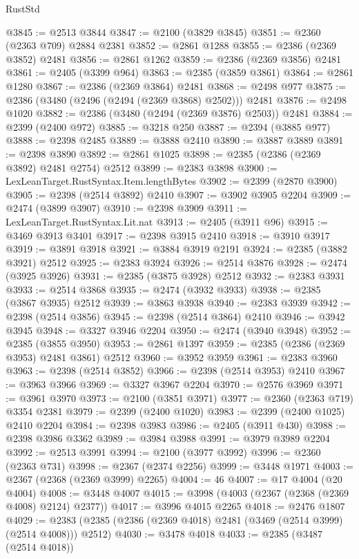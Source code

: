 \begin{lexlean}{RustStd}
\begin{coremodule}
@3845 := @2513 @3844
@3847 := @2100 (@3829 @3845)
@3851 := @2360 (@2363 @709) @2884 @2381
@3852 := @2861 @1288
@3855 := @2386 (@2369 @3852) @2481
@3856 := @2861 @1262
@3859 := @2386 (@2369 @3856) @2481
@3861 := @2405 (@3399 @964)
@3863 := @2385 (@3859 @3861)
@3864 := @2861 @1280
@3867 := @2386 (@2369 @3864) @2481
@3868 := @2498 @977
@3875 := @2386 (@3480 (@2496 (@2494 (@2369 @3868) @2502))) @2481
@3876 := @2498 @1020
@3882 := @2386 (@3480 (@2494 (@2369 @3876) @2503)) @2481
@3884 := @2399 (@2400 @972)
@3885 := @3218 @250
@3887 := @2394 (@3885 @977)
@3888 := @2398 @2485
@3889 := @3888 @2410
@3890 := @3887 @3889
@3891 := @2398 @3890
@3892 := @2861 @1025
@3898 := @2385 (@2386 (@2369 @3892) @2481 @2754) @2512
@3899 := @2383 @3898
@3900 := LexLeanTarget.RustSyntax.Item.lengthBytes
@3902 := @2399 (@2870 @3900)
@3905 := @2398 (@2514 @3892) @2410
@3907 := @3902 @3905 @2204
@3909 := @2474 (@3899 @3907)
@3910 := @2398 @3909
@3911 := LexLeanTarget.RustSyntax.Lit.nat
@3913 := @2405 (@3911 @96)
@3915 := @3469 @3913 @3401
@3917 := @2398 @3915 @2410
@3918 := @3910 @3917
@3919 := @3891 @3918
@3921 := @3884 @3919 @2191
@3924 := @2385 (@3882 @3921) @2512
@3925 := @2383 @3924
@3926 := @2514 @3876
@3928 := @2474 (@3925 @3926)
@3931 := @2385 (@3875 @3928) @2512
@3932 := @2383 @3931
@3933 := @2514 @3868
@3935 := @2474 (@3932 @3933)
@3938 := @2385 (@3867 @3935) @2512
@3939 := @3863 @3938
@3940 := @2383 @3939
@3942 := @2398 (@2514 @3856)
@3945 := @2398 (@2514 @3864) @2410
@3946 := @3942 @3945
@3948 := @3327 @3946 @2204
@3950 := @2474 (@3940 @3948)
@3952 := @2385 (@3855 @3950)
@3953 := @2861 @1397
@3959 := @2385 (@2386 (@2369 @3953) @2481 @3861) @2512
@3960 := @3952 @3959
@3961 := @2383 @3960
@3963 := @2398 (@2514 @3852)
@3966 := @2398 (@2514 @3953) @2410
@3967 := @3963 @3966
@3969 := @3327 @3967 @2204
@3970 := @2576 @3969
@3971 := @3961 @3970
@3973 := @2100 (@3851 @3971)
@3977 := @2360 (@2363 @719) @3354 @2381
@3979 := @2399 (@2400 @1020)
@3983 := @2399 (@2400 @1025) @2410 @2204
@3984 := @2398 @3983
@3986 := @2405 (@3911 @430)
@3988 := @2398 @3986 @3362
@3989 := @3984 @3988
@3991 := @3979 @3989 @2204
@3992 := @2513 @3991
@3994 := @2100 (@3977 @3992)
@3996 := @2360 (@2363 @731)
@3998 := @2367 (@2374 @2256)
@3999 := @3448 @1971
@4003 := @2367 (@2368 (@2369 @3999) @2265)
@4004 := 46
@4007 := @17 @4004 (@20 @4004)
@4008 := @3448 @4007
@4015 := @3998 (@4003 (@2367 (@2368 (@2369 @4008) @2124) @2377))
@4017 := @3996 @4015 @2265
@4018 := @2476 @1807
@4029 := @2383 (@2385 (@2386 (@2369 @4018) @2481 (@3469 (@2514 @3999) (@2514 @4008))) @2512)
@4030 := @3478 @4018
@4033 := @2385 (@3487 (@2514 @4018))

\end{coremodule}
\end{lexlean}
